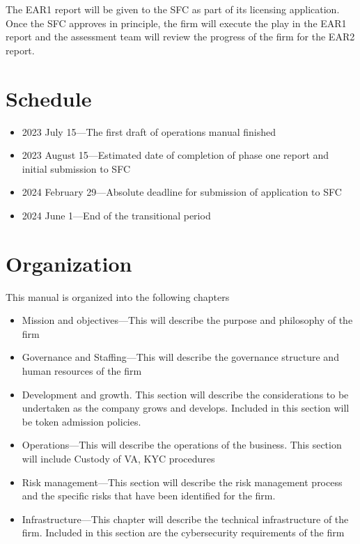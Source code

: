 The EAR1 report will be given to the SFC as part of its licensing
application.  Once the SFC approves in principle, the firm will
execute the play in the EAR1 report and the assessment team will
review the progress of the firm for the EAR2 report.

\section{Schedule}
\begin{itemize}
\item 2023 July 15—The first draft of operations manual finished
  \item 2023 August 15—Estimated date of completion of phase one
    report and initial submission to SFC
    \item 2024 February 29—Absolute deadline for submission of
      application to SFC
    \item 2024 June 1—End of the transitional period
\end{itemize}


\section{Organization}

This manual is organized into the following chapters

\begin{itemize}
\item Mission and objectives—This will describe the purpose and
  philosophy of the firm
  \item Governance and Staffing—This will describe the governance
    structure and human resources of the firm
  \item Development and growth.  This section will describe the
    considerations to be undertaken as the company grows and develops.
    Included in this section will be token admission policies.
  \item Operations—This will describe the operations of the
    business.  This section will include Custody of VA, KYC procedures
  \item Risk management—This section will describe the risk
    management process and the specific risks that have been
    identified for the firm.
  \item Infrastructure—This chapter will describe the technical
    infrastructure of the firm.  Included in this section are the
    cybersecurity requirements of the firm
\end{itemize}

